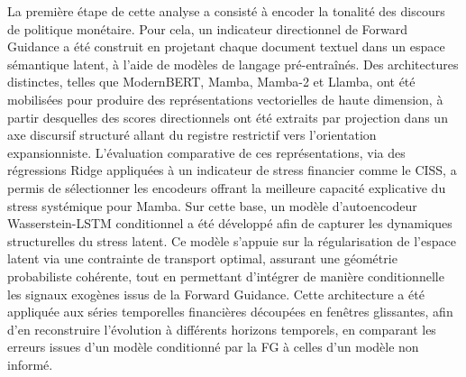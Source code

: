 La première étape de cette analyse a consisté à encoder la tonalité des discours de politique monétaire. Pour cela, un indicateur directionnel de Forward Guidance a été construit en projetant chaque document textuel dans un espace sémantique latent, à l’aide de modèles de langage pré-entraînés. Des architectures distinctes, telles que ModernBERT, Mamba, Mamba-2 et Llamba, ont été mobilisées pour produire des représentations vectorielles de haute dimension, à partir desquelles des scores directionnels ont été extraits par projection dans un axe discursif structuré allant du registre restrictif vers l’orientation expansionniste. L’évaluation comparative de ces représentations, via des régressions Ridge appliquées à un indicateur de stress financier comme le CISS, a permis de sélectionner les encodeurs offrant la meilleure capacité explicative du stress systémique pour Mamba. Sur cette base, un modèle d’autoencodeur Wasserstein-LSTM conditionnel a été développé afin de capturer les dynamiques structurelles du stress latent. Ce modèle s’appuie sur la régularisation de l’espace latent via une contrainte de transport optimal, assurant une géométrie probabiliste cohérente, tout en permettant d’intégrer de manière conditionnelle les signaux exogènes issus de la Forward Guidance. Cette architecture a été appliquée aux séries temporelles financières découpées en fenêtres glissantes, afin d’en reconstruire l’évolution à différents horizons temporels, en comparant les erreurs issues d’un modèle conditionné par la FG à celles d’un modèle non informé.\\

